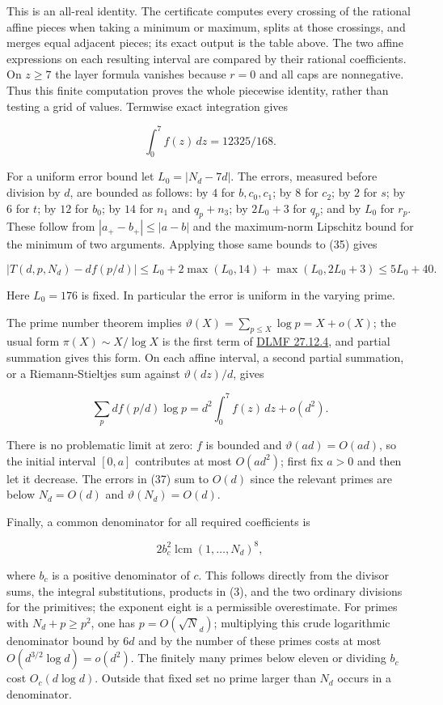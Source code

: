 \documentclass[11pt,a4paper]{article}
\begin{document}
This is an all-real identity. The certificate  computes every crossing of the rational affine pieces when taking a minimum or maximum, splits at those crossings, and merges equal adjacent pieces; its exact output is the table above. The two affine expressions on each resulting interval are compared by their rational coefficients. On \(z≥7\) the layer formula vanishes because \(r=0\) and all caps are nonnegative. Thus this finite computation proves the whole piecewise identity, rather than testing a grid of values. Termwise exact integration gives

\[
\int_0^7f(z)\,dz=12325/168.\tag{36}
\]

For a uniform error bound let \(L_{0}=|N_d-7d|\). The errors, measured before division by \(d\), are bounded as follows: by \(4\) for \(b,c_{0},c_{1}\); by \(8\) for \(c_{2}\); by \(2\) for \(s\); by \(6\) for \(t\); by \(12\) for \(b_{0}\); by \(14\) for \(n_{1}\) and \(q_p+n_{3}\); by \(2L_{0}+3\) for \(q_p\); and by \(L_{0}\) for \(r_p\). These follow from \(|a_+-b_+|≤|a-b|\) and the maximum-norm Lipschitz bound for the minimum of two arguments. Applying those same bounds to (35) gives

\[
|T(d,p,N_d)-df(p/d)|
\le L_0+2\max(L_0,14)+\max(L_0,2L_0+3)
\le5L_0+40.\tag{37}
\]

Here \(L_{0}=176\) is fixed. In particular the error is uniform in the varying prime.

The prime number theorem implies \(\vartheta (X)=\sum _{p≤X}\operatorname{log} p=X+o(X)\); the usual form \(π(X)∼X/\operatorname{log} X\) is the first term of \href{https://dlmf.nist.gov/27.12.E4}{DLMF 27.12.4}, and partial summation gives this form. On each affine interval, a second partial summation, or a Riemann-Stieltjes sum against \(\vartheta (dz)/d\), gives

\[
\sum_p d f(p/d)\log p
=d^2\int_0^7f(z)\,dz+o(d^2).
\]

There is no problematic limit at zero: \(f\) is bounded and \(\vartheta (ad)=O(ad)\), so the initial interval \([0,a]\) contributes at most \(O(ad^{2})\); first fix \(a>0\) and then let it decrease. The errors in (37) sum to \(O(d)\) since the relevant primes are below \(N_d=O(d)\) and \(\vartheta (N_d)=O(d)\).

Finally, a common denominator for all required coefficients is

\[
2b_c^2\operatorname{lcm}(1,\ldots,N_d)^8,
\]

where \(b_c\) is a positive denominator of \(c\). This follows directly from the divisor sums, the integral substitutions, products in (3), and the two ordinary divisions for the primitives; the exponent eight is a permissible overestimate. For primes with \(N_d+p≥p^{2}\), one has \(p=O(\surd N_d)\); multiplying this crude logarithmic denominator bound by \(6d\) and by the number of these primes costs at most \(O(d^{3/2}\operatorname{log} d)=o(d^{2})\). The finitely many primes below eleven or dividing \(b_c\) cost \(O_c(d \operatorname{log} d)\). Outside that fixed set no prime larger than \(N_d\) occurs in a denominator.
\end{document}
